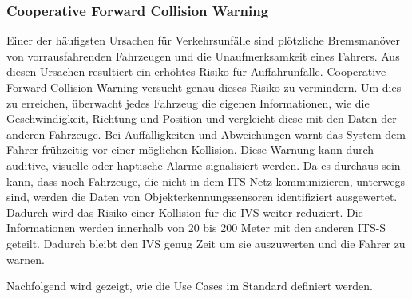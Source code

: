 \subsubsection{Cooperative Forward Collision Warning}
Einer der häufigsten Ursachen für Verkehrsunfälle sind plötzliche Bremsmanöver von vorrausfahrenden Fahrzeugen und die Unaufmerksamkeit eines Fahrers. Aus diesen Ursachen resultiert ein erhöhtes Risiko für Auffahrunfälle. Cooperative Forward Collision Warning versucht genau dieses Risiko zu vermindern. Um dies zu erreichen, überwacht jedes Fahrzeug die eigenen Informationen, wie die Geschwindigkeit, Richtung und Position und vergleicht diese mit den Daten der anderen Fahrzeuge. Bei Auffälligkeiten und Abweichungen warnt das System dem Fahrer frühzeitig vor einer möglichen Kollision. Diese Warnung kann durch auditive, visuelle oder haptische Alarme signalisiert werden. Da es durchaus sein kann, dass noch Fahrzeuge, die nicht in dem \ac{ITS} Netz kommunizieren, unterwegs sind, werden die Daten von Objekterkennungssensoren identifiziert ausgewertet. Dadurch wird das Risiko einer Kollision für die \ac{IVS} weiter reduziert. Die Informationen werden innerhalb von 20 bis 200 Meter mit den anderen \ac{ITS-S} geteilt. Dadurch bleibt den \ac{IVS} genug Zeit um sie auszuwerten und die Fahrer zu warnen.


Nachfolgend wird gezeigt, wie die Use Cases im Standard definiert werden.


